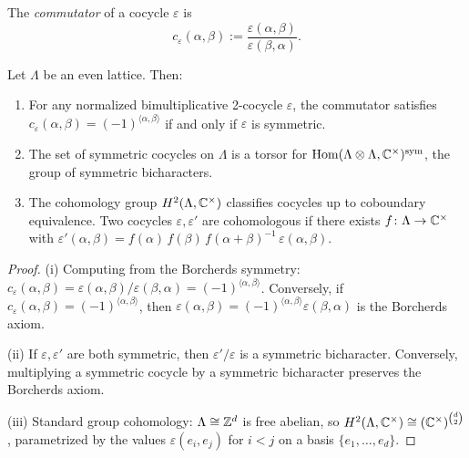 \begin{definition}\label{def:lattice:commutator}
The \emph{commutator} of a cocycle $\varepsilon$ is
\[
c_\varepsilon(\alpha, \beta)
:= \frac{\varepsilon(\alpha, \beta)}{\varepsilon(\beta, \alpha)}.
\]
\end{definition}

\begin{lemma}\label{lem:lattice:cocycle-class}
Let $\Lambda$ be an even lattice. Then:
\begin{enumerate}[label=(\roman*)]
\item For any normalized bimultiplicative 2-cocycle $\varepsilon$, the
  commutator satisfies
  $c_\varepsilon(\alpha, \beta) = (-1)^{\langle\alpha,\beta\rangle}$
  if and only if $\varepsilon$ is symmetric.
\item The set of symmetric cocycles on $\Lambda$ is a torsor for
  $\operatorname{Hom}(\Lambda \otimes \Lambda, \mathbb{C}^\times)^{\text{sym}}$, the group of
  symmetric bicharacters.
\item The cohomology group $H^2(\Lambda, \mathbb{C}^\times)$ classifies
  cocycles up to coboundary equivalence. Two cocycles
  $\varepsilon, \varepsilon'$ are cohomologous if there exists
  $f \colon \Lambda \to \mathbb{C}^\times$ with
  $\varepsilon'(\alpha,\beta) =
  f(\alpha)\,f(\beta)\,f(\alpha+\beta)^{-1}\,\varepsilon(\alpha,\beta)$.
\end{enumerate}
\end{lemma}

\begin{proof}
(i) Computing from the Borcherds symmetry:
$c_\varepsilon(\alpha,\beta) =
\varepsilon(\alpha,\beta)/\varepsilon(\beta,\alpha) =
(-1)^{\langle\alpha,\beta\rangle}$.
Conversely, if $c_\varepsilon(\alpha,\beta) =
(-1)^{\langle\alpha,\beta\rangle}$, then
$\varepsilon(\alpha,\beta) =
(-1)^{\langle\alpha,\beta\rangle}\varepsilon(\beta,\alpha)$
is the Borcherds axiom.

(ii) If $\varepsilon, \varepsilon'$ are both symmetric, then
$\varepsilon'/\varepsilon$ is a symmetric bicharacter. Conversely,
multiplying a symmetric cocycle by a symmetric bicharacter preserves
the Borcherds axiom.

(iii) Standard group cohomology: $\Lambda \cong \mathbb{Z}^d$ is free abelian,
so $H^2(\Lambda, \mathbb{C}^\times) \cong (\mathbb{C}^\times)^{\binom{d}{2}}$,
parametrized by the values $\varepsilon(e_i, e_j)$ for $i < j$ on a
basis $\{e_1, \ldots, e_d\}$.
\end{proof}

